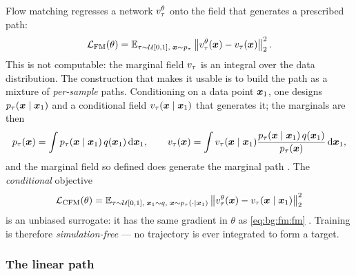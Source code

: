 Flow matching \parencite[Eq.~(5)]{lipman2023flow} regresses a network $v_{\tau}^{\theta}$ onto the
field that generates a prescribed path:
\begin{equation}\label{eq:bg:fm:fm}
  \mathcal{L}_{\textrm{FM}}(\theta)
  = \mathbb{E}_{\tau\sim\mathcal{U}[0,1],\;\boldsymbol{x}\sim p_{\tau}}
    \left\|v_{\tau}^{\theta}(\boldsymbol{x}) - v_{\tau}(\boldsymbol{x})\right\|_{2}^{2}.
\end{equation}
This is not computable: the marginal field $v_{\tau}$ is an integral over the data
distribution. The construction that makes it usable is to build the path as a mixture of
\emph{per-sample} paths. Conditioning on a data point $\boldsymbol{x}_{1}$, one designs
$p_{\tau}(\boldsymbol{x}\mid\boldsymbol{x}_{1})$ and a conditional field
$v_{\tau}(\boldsymbol{x}\mid\boldsymbol{x}_{1})$ that generates it; the marginals are then
\begin{equation}\label{eq:bg:fm:marginal}
  p_{\tau}(\boldsymbol{x}) = \int p_{\tau}(\boldsymbol{x}\mid\boldsymbol{x}_{1})\,q(\boldsymbol{x}_{1})\,\mathrm{d}\boldsymbol{x}_{1},
  \qquad
  v_{\tau}(\boldsymbol{x}) = \int v_{\tau}(\boldsymbol{x}\mid\boldsymbol{x}_{1})
    \frac{p_{\tau}(\boldsymbol{x}\mid\boldsymbol{x}_{1})\,q(\boldsymbol{x}_{1})}{p_{\tau}(\boldsymbol{x})}\,\mathrm{d}\boldsymbol{x}_{1},
\end{equation}
and the marginal field so defined does generate the marginal path
\parencite[Theorem~1]{lipman2023flow}. The \emph{conditional} objective
\begin{equation}\label{eq:bg:fm:cfm}
  \mathcal{L}_{\textrm{CFM}}(\theta)
  = \mathbb{E}_{\tau\sim\mathcal{U}[0,1],\;\boldsymbol{x}_{1}\sim q,\;\boldsymbol{x}\sim p_{\tau}(\cdot\mid\boldsymbol{x}_{1})}
    \left\|v_{\tau}^{\theta}(\boldsymbol{x}) - v_{\tau}(\boldsymbol{x}\mid\boldsymbol{x}_{1})\right\|_{2}^{2}
\end{equation}
is an unbiased surrogate: it has the same gradient in $\theta$ as \eqref{eq:bg:fm:fm}
\parencite[Theorem~2]{lipman2023flow}. Training is therefore \emph{simulation-free} --- no
trajectory is ever integrated to form a target.

\subsubsection*{The linear path}

